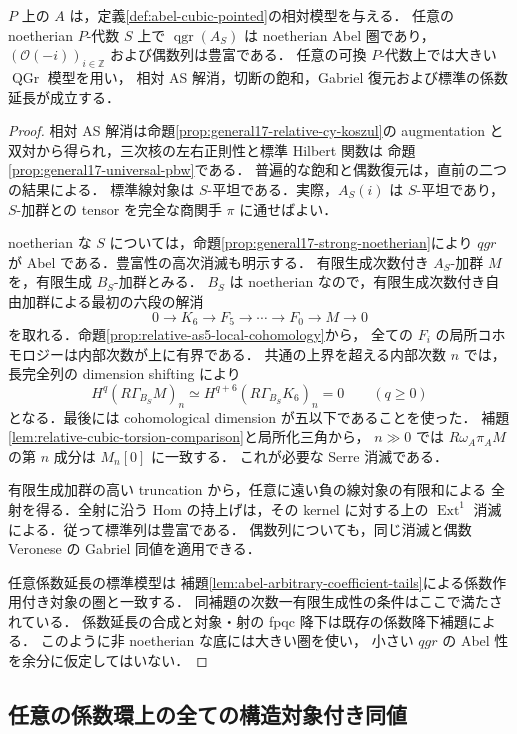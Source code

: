 \begin{proposition}
\label{prop:general17-abel-admissible}
$P$ 上の $A$ は，定義\ref{def:abel-cubic-pointed}の相対模型を与える．
任意の noetherian $P$-代数 $S$ 上で
$\operatorname{qgr}(A_S)$ は noetherian Abel 圏であり，
$(\mathcal O(-i))_{i\in\mathbb Z}$ および偶数列は豊富である．
任意の可換 $P$-代数上では大きい $\operatorname{QGr}$ 模型を用い，
相対 AS 解消，切断の飽和，Gabriel 復元および標準の係数延長が成立する．
\end{proposition}
\begin{proof}
相対 AS 解消は命題\ref{prop:general17-relative-cy-koszul}の augmentation と
双対から得られ，三次核の左右正則性と標準 Hilbert 関数は
命題\ref{prop:general17-universal-pbw}である．
普遍的な飽和と偶数復元は，直前の二つの結果による．
標準線対象は $S$-平坦である．実際，$A_S(i)$ は $S$-平坦であり，
$S$-加群との tensor を完全な商関手 $\pi$ に通せばよい．

noetherian な $S$ については，命題\ref{prop:general17-strong-noetherian}により
$qgr$ が Abel である．豊富性の高次消滅も明示する．
有限生成次数付き $A_S$-加群 $M$ を，有限生成 $B_S$-加群とみる．
$B_S$ は noetherian なので，有限生成次数付き自由加群による最初の六段の解消
\[
 0\to K_6\to F_5\to\cdots\to F_0\to M\to0
\]
を取れる．命題\ref{prop:relative-as5-local-cohomology}から，
全ての $F_i$ の局所コホモロジーは内部次数が上に有界である．
共通の上界を超える内部次数 $n$ では，長完全列の dimension shifting により
\[
 H^q(R\Gamma_{B_S}M)_n
 \simeq H^{q+6}(R\Gamma_{B_S}K_6)_n=0\qquad(q\geq0)
\]
となる．最後には cohomological dimension が五以下であることを使った．
補題\ref{lem:relative-cubic-torsion-comparison}と局所化三角から，
$n\gg0$ では $R\omega_A\pi_A M$ の第 $n$ 成分は $M_n[0]$ に一致する．
これが必要な Serre 消滅である．

有限生成加群の高い truncation から，任意に遠い負の線対象の有限和による
全射を得る．全射に沿う Hom の持上げは，その kernel に対する上の
$\operatorname{Ext}^1$ 消滅による．従って標準列は豊富である．
偶数列についても，同じ消滅と偶数 Veronese の Gabriel 同値を適用できる．

任意係数延長の標準模型は
補題\ref{lem:abel-arbitrary-coefficient-tails}による係数作用付き対象の圏と一致する．
同補題の次数一有限生成性の条件はここで満たされている．
係数延長の合成と対象・射の fpqc 降下は既存の係数降下補題による．
このように非 noetherian な底には大きい圏を使い，
小さい $qgr$ の Abel 性を余分に仮定してはいない．
\end{proof}

\subsection{任意の係数環上の全ての構造対象付き同値}

